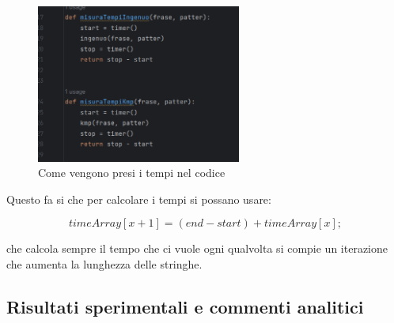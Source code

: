 \begin{figure}[H]
    \centering
    \includegraphics[width=0.6\textwidth]{Resources/tempi.png}
    \caption{Come vengono presi i tempi nel codice}
    \label{fig:codicePrendereTempo}
\end{figure}

Questo fa si che per calcolare i tempi si possano usare:

\begin{equation}
    timeArray[x+1]=(end-start)+timeArray[x];
    \label{eqn:timeArray1}
\end{equation}

che calcola sempre il tempo che ci vuole ogni qualvolta si compie un iterazione che aumenta la lunghezza delle stringhe.

\subsection{Risultati sperimentali e commenti analitici}
\label{sec:RisultatiSperimentaliCommentiAnalitici_1}
